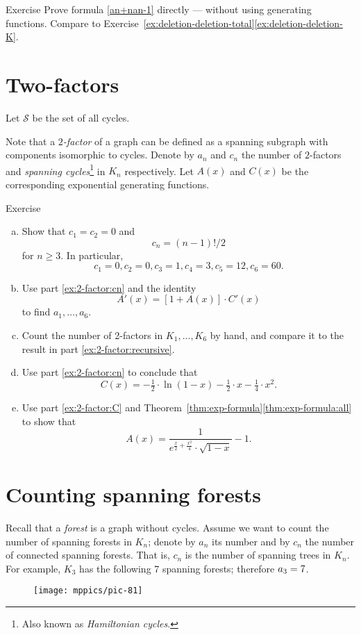 \begin{thm}{Exercise}
Prove formula \ref{an+nan-1} directly --- without using generating functions.
Compare to Exercise~\ref{ex:deletion-deletion-total}\ref{ex:deletion-deletion-K}.
\end{thm}

\section*{Two-factors}

Let $\mathcal{S}$ be the set of all cycles.

Note that a \emph{$2$-factor} of a graph can be defined as a spanning subgraph with components isomorphic to cycles.
Denote by $a_n$ and $c_n$ the number of $2$-factors and \emph{spanning cycles}\footnote{Also known as \emph{Hamiltonian cycles}.} in $K_n$ respectively.
Let $A(x)$ and $C(x)$ be the corresponding exponential generating functions.

\begin{thm}{Exercise}
\begin{enumerate}[(a)]
\item\label{ex:2-factor:cn} Show that $c_1=c_2=0$ and 
\[c_n=(n-1)!/2\]
for $n\ge 3$.
In particular,
\[c_1=0, c_2=0, c_3=1, c_4=3, c_5=12, c_6=60.\]
\item\label{ex:2-factor:recursive} Use part \ref{ex:2-factor:cn} and the identity
\[A'(x)=[1+A(x)]\cdot C'(x)\]
to find $a_1,\dots, a_6$.
\item Count the number of 2-factors in $K_1,\dots,K_6$ by hand, and compare it to the result in part \ref{ex:2-factor:recursive}.
\item\label{ex:2-factor:C} Use part \ref{ex:2-factor:cn} to conclude that 
\[C(x)=-\tfrac12\cdot\ln(1-x)-\tfrac12\cdot x-\tfrac14\cdot x^2.\]
\item Use part \ref{ex:2-factor:C} and Theorem~\ref{thm:exp-formula}\ref{thm:exp-formula:all}
to show that
\[A(x)=\frac{1}{ e^{\frac x2+\frac{x^2}4}\cdot\sqrt{1-x}}-1.\]
\end{enumerate}

\end{thm}



\section*{Counting spanning forests}


Recall that a \emph{forest} is a graph without cycles.
Assume we want to count the number of spanning forests in $K_n$;
denote by $a_n$ its number and by $c_n$ the number of connected spanning forests. 
That is, $c_n$ is the number of spanning trees in $K_n$.
For example, $K_3$ has the following 7 spanning forests; therefore $a_3\z=7$.
\begin{figure}[H]%
\vskip-0mm
\centering
\texttt{[image: mppics/pic-81]}
\vskip-0mm
\end{figure}


